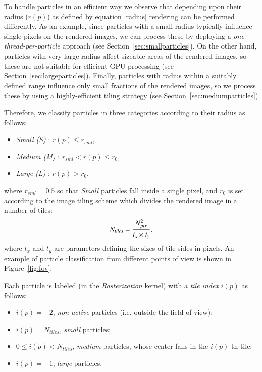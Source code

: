 \documentclass[1p]{elsarticle}
\begin{document}
To handle particles in an efficient way we observe that depending upon their radius ($r(p)$) as defined by equation \eqref{radius} rendering can be performed differently. As an example, since particles with a small radius typically influence single pixels on the rendered images, we can process these by deploying a {\it one-thread-per-particle} approach (see Section~\ref{sec:smallparticles}). On the other hand, particles with very large radius affect sizeable areas of the rendered images, so these are not suitable for efficient GPU processing (see Section~\ref{sec:largeparticles}). Finally, particles with radius within a suitably defined range influence only small fractions of the rendered images, so we process these by using a highly-efficient tiling strategy (see Section~\ref{sec:mediumparticles})

Therefore, we classify particles in three categories according to their radius as follows:

\begin{itemize}
\item
{\it Small (S)} : $r(p) \le r_{sml}$,
\item
{\it Medium (M)} : $r_{sml} < r(p) \le r_0$,
\item
{\it Large (L)} : $r(p) > r_0$.
\end{itemize}
where $r_{sml} = 0.5$ so that {\it Small} particles fall inside a single pixel, and 
$r_0$ is set according to the image tiling scheme which divides the rendered image
in a number of tiles:  
\begin{equation}
N_{tiles} = {N_{pix}^2\over t_x \times t_y},
\end{equation}
where $t_x$ and $t_y$ are parameters defining the sizes of tile sides in pixels.
An example of particle classification from different points of view is shown in Figure~\ref{fig:fov}.

Each particle is labeled (in the {\it Rasterization} kernel) with a {\it tile index} $i(p)$ as follows:
\begin{itemize}
\item
$i(p) = -2$, {\it non-active} particles (i.e. outside the field of view);
\item
$i(p) = N_{tiles}$, {\it small} particles;
\item
$0 \le i(p) < N_{tiles}$, {\it medium} particles, whose center falls in the $i(p)$-th tile;  
\item
$i(p) = -1$, {\it large} particles.
\end{itemize}
\end{document}

